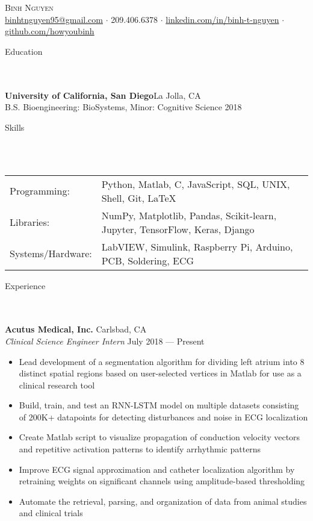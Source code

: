 \documentclass{article}
\newcommand{\lineunder} {
    \vspace*{-8pt} \\
    \hspace*{-18pt} \hrulefill \\
}
\newcommand{\header} [1] {
    {\hspace*{-18pt}\vspace*{6pt} \Large{#1} }
    \vspace*{-6pt} 
    \lineunder
}
\begin{document}
\vspace*{-40pt}

  

\begin{center}
	{\Huge \scshape {Binh Nguyen}}\\
	\href{mailto:binhtnguyen95@gmail.com}{binhtnguyen95@gmail.com} $\cdot$ 
	209.406.6378 $\cdot$ 
	\href{https://www.linkedin.com/in/binh-t-nguyen}{linkedin.com/in/binh-t-nguyen} $\cdot$ 
	\href{https://www.github.com/howyoubinh}{github.com/howyoubinh}\\
\end{center}

\header{Education}
\textbf{University of California, San Diego}\hfill La Jolla, CA\\
B.S. Bioengineering: BioSystems, Minor: Cognitive Science \hfill 2018\\
\vspace{2mm}

\header{Skills}
\vspace{1mm}
\begin{tabular}{ l l }
	Programming: & Python, Matlab, C, JavaScript, SQL, UNIX, Shell, Git, \LaTeX \\
	Libraries:   & NumPy, Matplotlib, Pandas, Scikit-learn, Jupyter, TensorFlow, Keras, Django \\
	Systems/Hardware:    & LabVIEW, Simulink, Raspberry Pi, Arduino, PCB, Soldering, ECG \\
\end{tabular}

\header{Experience}

\textbf{Acutus Medical, Inc.} \hfill Carlsbad, CA\\
\textit{Clinical Science Engineer Intern} \hfill July 2018 --- Present\\
\vspace{-2mm}
\begin{itemize} \itemsep 0.05pt
	\item Lead development of a segmentation algorithm for dividing left atrium into 8 distinct spatial regions based on user-selected vertices in Matlab for use as a clinical research tool
	\item Build, train, and test an RNN-LSTM model on multiple datasets consisting of 200K+ datapoints for detecting disturbances and noise in ECG localization
	\item Create Matlab script to visualize propagation of conduction velocity vectors and repetitive activation patterns to identify arrhythmic patterns
	\item Improve ECG signal approximation and catheter localization algorithm by retraining weights on significant channels using amplitude-based thresholding
	\item Automate the retrieval, parsing, and organization of data from animal studies and clinical trials
\end{itemize}
\end{document}
